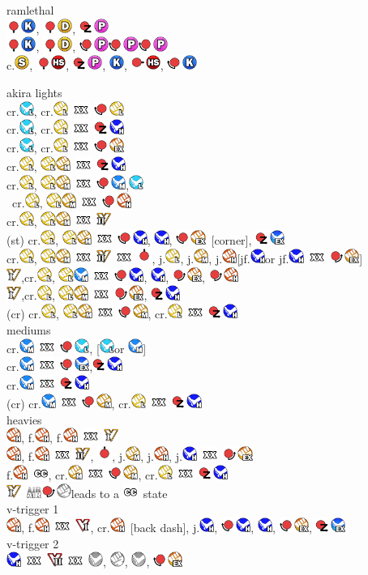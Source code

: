 \documentclass[a4paper]{article}
\newcommand{\dragonpunch}{\includegraphics[height=1.3em]{dp}}
\newcommand{\qcf}{\includegraphics[height=1.3em]{qcf}}
\newcommand{\qcb}{\includegraphics[height=1.3em]{qcb}}
\newcommand{\up}{\includegraphics[height=1.3em]{up}}
\newcommand{\down}{\includegraphics[height=1.3em]{down}}
\newcommand{\forward}{\includegraphics[height=1.3em]{forward}}
\newcommand{\anypunch}{\includegraphics[height=1.3em]{punch}}
\newcommand{\lpunch}{\includegraphics[height=1.3em]{lpunch}}
\newcommand{\mpunch}{\includegraphics[height=1.3em]{mpunch}}
\newcommand{\hpunch}{\includegraphics[height=1.3em]{hpunch}}
\newcommand{\expunch}{\includegraphics[height=1.3em]{expunch}}
\newcommand{\anykick}{\includegraphics[height=1.3em]{kick}}
\newcommand{\lkick}{\includegraphics[height=1.3em]{lkick}}
\newcommand{\mkick}{\includegraphics[height=1.3em]{mkick}}
\newcommand{\hkick}{\includegraphics[height=1.3em]{hkick}}
\newcommand{\exkick}{\includegraphics[height=1.3em]{exkick}}
\newcommand{\btnp}{\includegraphics[height=1.3em]{arc-punch}}
\newcommand{\btnk}{\includegraphics[height=1.3em]{arc-kick}}
\newcommand{\btns}{\includegraphics[height=1.3em]{slash}}
\newcommand{\btnhs}{\includegraphics[height=1.3em]{hslash}}
\newcommand{\dust}{\includegraphics[height=1.3em]{dust}}
\newcommand{\btnd}{\dust}
\newcommand{\vsone}{\includegraphics[height=1.3em]{vskill1}}
\newcommand{\vstwo}{\includegraphics[height=1.3em]{vskill2}}
\newcommand{\vtone}{\includegraphics[height=1.3em]{vtrigger1}}
\newcommand{\vttwo}{\includegraphics[height=1.3em]{vtrigger2}}
\newcommand{\cancel}{\ \includegraphics[height=1.3em]{cancel}\ }
\newcommand{\crush}{\includegraphics[height=1.3em]{crush}}
\newcommand{\air}{\ \includegraphics[height=1.3em]{air}}
\begin{document}
\sffamily

\noindent
ramlethal \\
\down\btnk, \down\btnd, \dragonpunch\btnp \\
\down\btnk, \down\btnd, \qcb\btnp\qcb\btnp\qcb\btnp \\
c.\btns, \down\btnhs, \dragonpunch\btnp, \btnk, \forward\btnhs, \qcb\btnk

\smallbreak
\noindent
akira lights \\
cr.\lkick, cr.\lpunch\cancel\qcb\lpunch \\
cr.\lkick, cr.\lpunch\cancel\dragonpunch\hkick \\
cr.\lkick, cr.\lpunch\cancel\qcb\expunch \\
cr.\lpunch, \lpunch\mpunch\cancel\dragonpunch\hkick \\
cr.\lpunch, \lpunch\mpunch\cancel\qcb\mkick,\lkick \\\
cr.\lpunch, \lpunch\mpunch\cancel\qcb\hpunch \\
cr.\lpunch, \lpunch\mpunch\cancel\vstwo \\
(st) cr.\lpunch, \lpunch\mpunch\cancel\qcb\hkick, \hkick, \qcb\expunch\ [corner], \dragonpunch\exkick \\
cr.\lpunch, \lpunch\mpunch\cancel\vstwo\cancel\up, j.\lpunch, j.\mpunch, j.\hpunch [jf.\hkick or jf.\hkick\cancel\qcf\expunch] \\
\vsone,cr.\lpunch, \lpunch\mkick\cancel\qcb\hkick, \hkick, \qcf\expunch, \qcf\hpunch \\
\vsone,cr.\lpunch, \lpunch\mpunch\cancel\qcf\expunch, \dragonpunch\hkick \\
(cr) cr.\lpunch, \lpunch\mpunch\cancel\qcb\mpunch, cr.\lpunch\cancel\dragonpunch\hkick \\

\smallbreak
\noindent
mediums \\
cr.\mkick\cancel\qcb\lkick, [\lkick or \mkick] \\
cr.\mkick\cancel\qcb\exkick,\dragonpunch\hkick \\
cr.\mkick\cancel\dragonpunch\hkick \\
(cr) cr.\mkick\cancel\qcb\mpunch, cr.\lpunch\cancel\dragonpunch\hkick \\

\smallbreak
\noindent
heavies \\
\hpunch, f.\hpunch, f.\hpunch\cancel\vsone \\
\hpunch, f.\hpunch\cancel\vstwo, \up, j.\mpunch, j.\hpunch, j.\hkick\cancel\qcf\expunch \\
f.\hpunch\ \crush, cr.\mpunch\cancel\qcb\mpunch, cr.\lpunch\cancel\dragonpunch\hkick \\
\vsone\air\qcf\anypunch leads to a \crush\ state \\

\smallbreak
\noindent
v-trigger 1 \\
\hpunch, f.\hpunch\cancel\vtone, cr.\hpunch\ [back dash], j.\hkick, \qcb\hkick, \hkick, \qcb\expunch, \dragonpunch\exkick \\
v-trigger 2 \\
\hkick\cancel\vttwo\cancel\anykick, \anypunch, \anykick, \qcb\expunch \\
\end{document}
